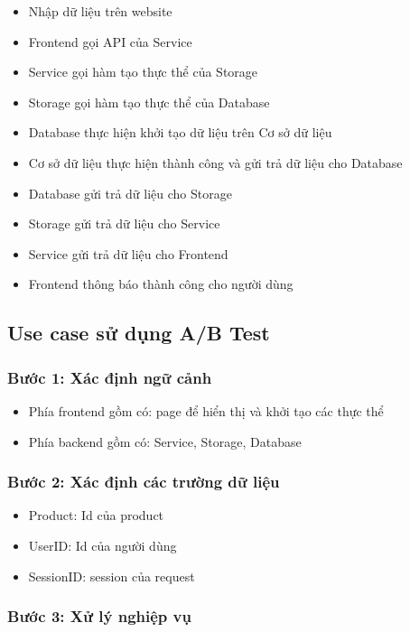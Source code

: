 \begin{itemize}
	\item Nhập dữ liệu trên website
	\item Frontend gọi API của Service
	\item Service gọi hàm tạo thực thể của Storage
	\item Storage gọi hàm tạo thực thể của Database
	\item Database thực hiện khởi tạo dữ liệu trên Cơ sở dữ liệu
	\item Cơ sở dữ liệu thực hiện thành công và gửi trả dữ liệu cho Database
	\item Database gửi trả dữ liệu cho Storage
	\item Storage gửi trả dữ liệu cho Service
	\item Service gửi trả dữ liệu cho Frontend
	\item Frontend thông báo thành công cho người dùng
\end{itemize}

\subsection{Use case sử dụng A/B Test}

\subsubsection{Bước 1: Xác định ngữ cảnh}

\begin{itemize}
	\item Phía frontend gồm có: page để hiển thị và khởi tạo các thực thể
	\item Phía backend gồm có: Service, Storage, Database
\end{itemize}

\subsubsection{Bước 2: Xác định các trường dữ liệu}

\begin{itemize}
	\item Product: Id của product
	\item UserID: Id của người dùng
	\item SessionID: session của request
\end{itemize}

\subsubsection{Bước 3: Xử lý nghiệp vụ}

